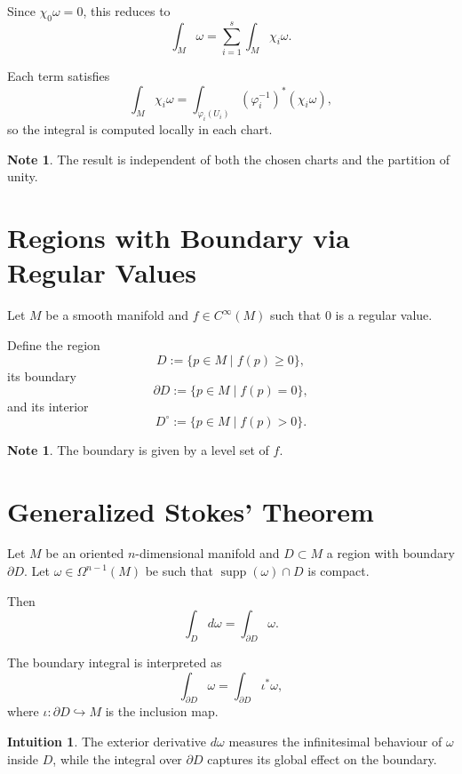\documentclass[11pt]{report}
\theoremstyle{definition}
\newtheorem{note}[definition]{Note}
\newtheorem{intuition}[definition]{Intuition}
\theoremstyle{plain}
\theoremstyle{remark}
\newcommand{\supp}{\operatorname{supp}}
\begin{document}
Since $\chi_0 \omega = 0$, this reduces to
\[
\int_M \omega = \sum_{i=1}^s \int_M \chi_i \omega.
\]

Each term satisfies
\[
\int_M \chi_i \omega
=
\int_{\varphi_i(U_i)} (\varphi_i^{-1})^*(\chi_i \omega),
\]
so the integral is computed locally in each chart.

\begin{note}
The result is independent of both the chosen charts and the partition of unity.
\end{note}

\section{Regions with Boundary via Regular Values}

Let $M$ be a smooth manifold and $f \in C^\infty(M)$ such that $0$ is a regular value.

Define the region
\[
D := \{p \in M \mid f(p) \ge 0\},
\]
its boundary
\[
\partial D := \{p \in M \mid f(p) = 0\},
\]
and its interior
\[
D^\circ := \{p \in M \mid f(p) > 0\}.
\]

\begin{note}
The boundary is given by a level set of $f$.
\end{note}

\section{Generalized Stokes' Theorem}

Let $M$ be an oriented $n$-dimensional manifold and $D \subset M$ a region with boundary $\partial D$. Let $\omega \in \Omega^{n-1}(M)$ be such that $\supp(\omega)\cap D$ is compact.

Then
\[
\int_D d\omega = \int_{\partial D} \omega.
\]

The boundary integral is interpreted as
\[
\int_{\partial D} \omega = \int_{\partial D} \iota^*\omega,
\]
where $\iota:\partial D \hookrightarrow M$ is the inclusion map.

\begin{intuition}
The exterior derivative $d\omega$ measures the infinitesimal behaviour of $\omega$ inside $D$, while the integral over $\partial D$ captures its global effect on the boundary.
\end{intuition}
\end{document}
